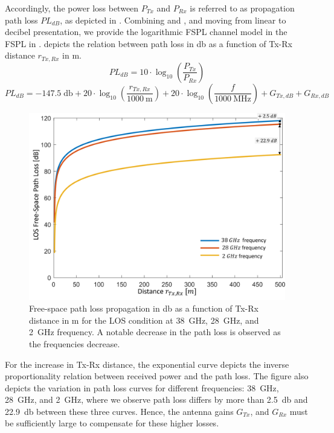 Accordingly, the power loss between $P_{Tx}$ and $P_{Rx}$ is referred to as propagation path loss $PL_{dB}$, as depicted in  . Combining  and , and moving from linear to decibel presentation, we provide the logarithmic FSPL channel model in the FSPL in  .  depicts the relation between path loss in \si{\decibel} as a function of Tx-Rx distance $r_{Tx, Rx}$ in \si{\meter}. 
\begin{equation} \label{Eq:path loss formula}
	PL_{dB}= 10\cdot \log_{10} \left( \frac{P_{Tx}}{P_{Rx}} \right) 
\end{equation}
\begin{equation} \label{equation1}
	PL_{dB}= -147.5 \; \si{\decibel} + 20 \cdot  \log_{10} \left(\frac{r_{Tx, Rx}}{\SI{1000}{\meter}} \right) + 20 \cdot \log_{10} \left(\frac{f}{\SI{1000}{\mega\hertz}}\right) + G_{Tx, dB} + G_{Rx, dB}
\end{equation}
\begin{figure}[tb]
	\centering
	\includegraphics[width=0.8\linewidth]{images/Section 2 Images/fspl}
	\caption{Free-space path loss propagation in \si{\decibel} as a function of Tx-Rx distance in \si{\meter} for the \ac{LOS} condition at \SI{38}{\giga\hertz}, \SI{28}{\giga\hertz}, and \SI{2}{\giga\hertz} frequency. A notable decrease in the path loss is observed as the frequencies decrease.}
	\label{fig:fspl}
\end{figure}
For the increase in Tx-Rx distance, the exponential curve depicts the inverse proportionality relation between received power and the path loss. The figure also depicts the variation in path loss curves for different frequencies: \SI{38}{\giga\hertz}, \SI{28}{\giga\hertz}, and \SI{2}{\giga\hertz}, where we observe path loss differs by more than \SI{2.5}{\decibel} and \SI{22.9}{\decibel} between these three curves. Hence, the antenna gains $G_{Tx}$, and $G_{Rx}$ must be sufficiently large to compensate for these higher losses.
